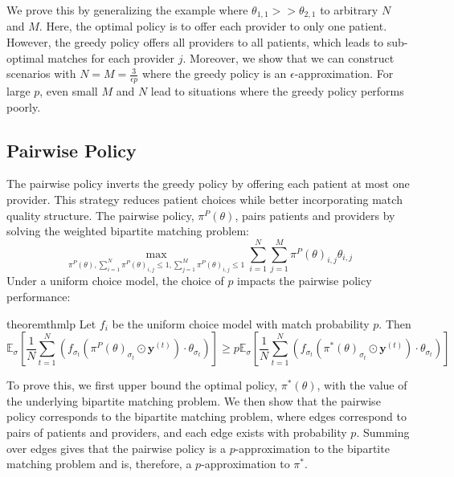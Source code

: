 We prove this by generalizing the example where $\theta_{1,1} >> \theta_{2,1}$ to arbitrary $N$ and $M$. 
Here, the optimal policy is to offer each provider to only one patient. 
However, the greedy policy offers all providers to all patients, which leads to sub-optimal matches for each provider $j$. 
Moreover, we show that we can construct scenarios with $N=M=\frac{3}{\epsilon p}$ where the greedy policy is an $\epsilon$-approximation. 
For large $p$, even small $M$ and $N$ lead to situations where the greedy policy performs poorly. 

\subsection{Pairwise Policy}
\label{sec:pairwise}
The pairwise policy inverts the greedy policy by offering each patient at most one provider. 
This strategy reduces patient choices while better incorporating match quality structure. 
The pairwise policy, $\pi^{P}(\theta)$, pairs patients and providers by solving the weighted bipartite matching problem: 
\begin{equation}
   \max\limits_{\pi^{P}(\theta), \sum_{i=1}^{N} \pi^{P}(\theta)_{i,j} \leq 1, \sum_{j=1}^{M} \pi^{P}(\theta)_{i,j} \leq 1} \sum_{i=1}^{N} \sum_{j=1}^{M} \pi^{P}(\theta)_{i,j} \theta_{i,j}
\end{equation}
Under a uniform choice model, the choice of $p$ impacts the pairwise policy performance: 
\begin{restatable}{theorem}{thmlp}
\label{thm:lp}
    Let $f_{i}$ be the uniform choice model with match probability $p$. 
    Then 
    \begin{equation}
        \mathbb{E}_{\sigma}[\frac{1}{N} \sum_{t=1}^{N} (f_{\sigma_{t}}\left(\pi^{P}(\theta)_{\sigma_{t}} \odot \mathbf{y}^{(t)}\right)  \cdot \theta_{\sigma_{t}})] \geq p \mathbb{E}_{\sigma}[\frac{1}{N} \sum_{t=1}^{N} (f_{\sigma_{t}}\left(\pi^{*}(\theta)_{\sigma_{t}} \odot \mathbf{y}^{(t)}\right)  \cdot \theta_{\sigma_{t}})]
    \end{equation}

\end{restatable}
To prove this, we first upper bound the optimal policy, $\pi^{*}(\theta)$, with the value of the underlying bipartite matching problem. 
We then show that the pairwise policy corresponds to the bipartite matching problem, where edges correspond to pairs of patients and providers, and each edge exists with probability $p$. 
Summing over edges gives that the pairwise policy is a $p$-approximation to the bipartite matching problem and is, therefore, a $p$-approximation to $\pi^{*}$. 

